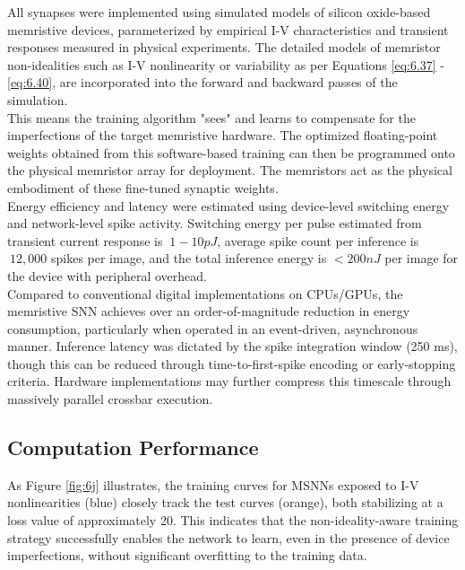 \noindent All synapses were implemented using simulated models of silicon oxide-based memristive devices, parameterized by empirical I-V characteristics and transient responses measured in physical experiments. The detailed models of memristor non-idealities such as I-V nonlinearity or variability as per Equations \ref{eq:6.37} - \ref{eq:6.40}, are incorporated into the forward and backward passes of the simulation. \\

\noindent This means the training algorithm "sees" and learns to compensate for the imperfections of the target memristive hardware. The optimized floating-point weights obtained from this software-based training can then be programmed onto the physical memristor array for deployment. The memristors act as the physical embodiment of these fine-tuned synaptic weights.\\

\noindent Energy efficiency and latency were estimated using device-level switching energy and network-level spike activity. Switching energy per pulse estimated from transient current response is $~1-10 pJ$, average spike count per inference is $~12,000$ spikes per image, and the total inference energy is $< 200 nJ$ per image for the device with peripheral overhead. \\

\noindent Compared to conventional digital implementations on CPUs/GPUs, the memristive SNN achieves over an order-of-magnitude reduction in energy consumption, particularly when operated in an event-driven, asynchronous manner. Inference latency was dictated by the spike integration window (250 ms), though this can be reduced through time-to-first-spike encoding or early-stopping criteria. Hardware implementations may further compress this timescale through massively parallel crossbar execution.

\subsection[Computation Performance]{Computation Performance}


As Figure \ref{fig:6j} illustrates, the training curves for MSNNs exposed to I-V nonlinearities (blue) closely track the test curves (orange), both stabilizing at a loss value of approximately 20. This indicates that the non-ideality-aware training strategy successfully enables the network to learn, even in the presence of device imperfections, without significant overfitting to the training data.\\

